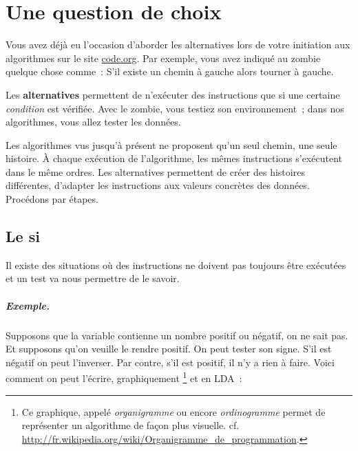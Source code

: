 \chapter{Une question de choix}

	Vous avez déjà eu l’occasion d’aborder les alternatives
	lors de votre initiation aux algorithmes sur le site
	\url{code.org}.
	Par exemple, vous avez indiqué au zombie quelque chose comme~:
	\og{}S’il existe un chemin à gauche alors tourner à gauche\fg{}.
	
	Les \textbf{alternatives} 
	permettent de n’exécuter des instructions
	que si une certaine \emph{condition} est vérifiée.
	Avec le zombie, vous testiez son environnement~;
	dans nos algorithmes, vous allez tester les données.
	
	Les algorithmes vus jusqu’à présent ne proposent
	qu’un seul \og{}chemin\fg{}, une seule \og{}histoire\fg{}.
	À chaque exécution de l’algorithme,
	les mêmes instructions s’exécutent dans le même ordres.
	Les alternatives permettent de créer des histoires différentes,
	d’adapter les instructions aux valeurs concrètes des données.
	Procédons par étapes.

\section{Le si}
		
	Il existe des situations où
	des instructions ne doivent pas toujours être exécutées
	et un test va nous permettre de le savoir.
	
	\paragraph{Exemple.}
	Supposons que la variable 
	contienne un nombre positif ou négatif,
	on ne sait pas.
	Et supposons qu’on veuille le rendre positif.
	On peut tester son signe.
	S’il est négatif on peut l’inverser.
	Par contre, s’il est positif,
	il n’y a rien à faire.
	Voici comment on peut l’écrire,
	graphiquement%
	\footnote{%
		Ce graphique, appelé 
		\emph{organigramme} ou encore \emph{ordinogramme}
		permet de représenter un algorithme
		de façon plus visuelle.
		cf. \url{http://fr.wikipedia.org/wiki/Organigramme_de_programmation}.
	} et en LDA~:
	
